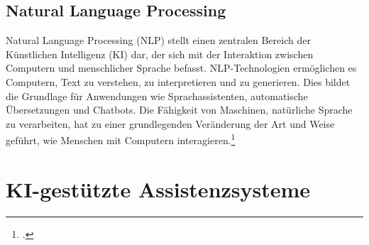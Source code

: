 \subsection{Natural Language Processing}

Natural Language Processing (NLP) stellt einen zentralen Bereich der Künstlichen Intelligenz (KI) dar, der sich mit der Interaktion zwischen Computern und menschlicher Sprache befasst. NLP-Technologien ermöglichen es Computern, Text zu verstehen, zu interpretieren und zu generieren. Dies bildet die Grundlage für Anwendungen wie Sprachassistenten, automatische Übersetzungen und Chatbots. Die Fähigkeit von Maschinen, natürliche Sprache zu verarbeiten, hat zu einer grundlegenden Veränderung der Art und Weise geführt, wie Menschen mit Computern interagieren.\footcite[22]{oecd_oecd-bericht_2024}

\section{KI-gestützte Assistenzsysteme}